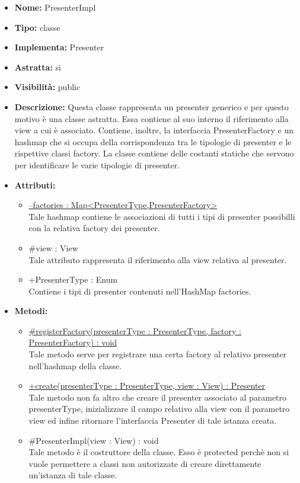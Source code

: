			
			\begin{itemize}
			\item \textbf{Nome:} PresenterImpl
			\item \textbf{Tipo:} classe
			
		\item \textbf{Implementa:}
		Presenter
		\item \textbf{Astratta:}
		si
			\item \textbf{Visibilità:} public
			\item \textbf{Descrizione:} Questa classe rappresenta un presenter generico e per questo motivo è una classe astratta. Essa contiene al suo interno il riferimento alla view a cui è associato. Contiene, inoltre, la interfaccia PresenterFactory e un hashmap che si occupa della corrispondenza tra le tipologie di presenter e le rispettive classi factory. La classe contiene delle costanti statiche che servono per identificare le varie tipologie di presenter.
			\item \textbf{Attributi:}
				\begin{itemize}
				\setlength{\itemsep}{5pt}
				
					\item[\ding{111}] \underline{--factories : Map<PresenterType,PresenterFactory>} \\ [1mm] Tale hashmap contiene le associazioni di tutti i tipi di presenter possibilli con la relativa factory dei presenter.
					\item[\ding{111}] {\#view : View} \\ [1mm] Tale attributo rappresenta il riferimento alla view relativa al presenter.
					\item[\ding{111}] {+PresenterType : Enum} \\ [1mm] Contiene i tipi di presenter contenuti nell'HashMap factories.
				\end{itemize}
		
			\item \textbf{Metodi:}
				\begin{itemize}
				\setlength{\itemsep}{5pt}
				
					\item[\ding{111}] {\underline{\#registerFactory(presenterType : PresenterType, factory : PresenterFactory) : void}} \\ [1mm] Tale metodo serve per registrare una certa factory al relativo presenter nell'hashmap della classe.
					\item[\ding{111}] {\underline{+create(presenterType : PresenterType, view : View) : Presenter}} \\ [1mm] Tale metodo non fa altro che creare il presenter associato al parametro presenterType, inizializzare il campo relativo alla view con il parametro view ed infine ritornare l'interfaccia Presenter di tale istanza creata.
					\item[\ding{111}] {{\#PresenterImpl(view : View) : void}} \\ [1mm] Tale metodo è il costruttore della classe. Esso è protected perchè non si vuole permettere a classi non autorizzate di creare direttamente un'istanza di tale classe.
				\end{itemize}
		

\end{itemize}
